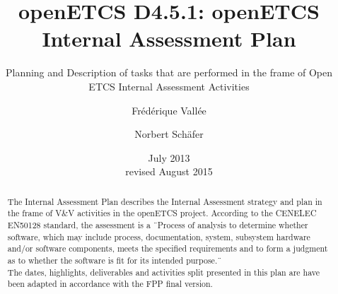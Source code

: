 \documentclass{template/openetcs_article}
\begin{document}
\frontmatter
{}




\title{openETCS D4.5.1: openETCS Internal Assessment Plan}

\subtitle{Planning and Description of tasks that are performed in the frame of Open ETCS Internal Assessment Activities}

\date{July 2013\\revised August 2015}

\author{Fr\'ed\'erique Vall\'ee}


\author{Norbert Sch\"afer}









\begin{abstract}
The Internal Assessment Plan describes the Internal Assessment strategy and plan in the frame of V\&V activities in the openETCS \cite{openETCS} project.
According to the CENELEC EN50128 \cite{EN50128:2011} standard, the assessment is a \"\ Process of analysis to determine whether software, which may include
process, documentation, system, subsystem hardware and/or software components, meets the specified requirements and to form a judgment as to whether the
software is fit for its intended purpose.\"\
\\
The dates, highlights, deliverables and activities split presented in this plan are have been adapted in accordance with the FPP \cite{FPP} final version.
\end{abstract}
\end{document}
